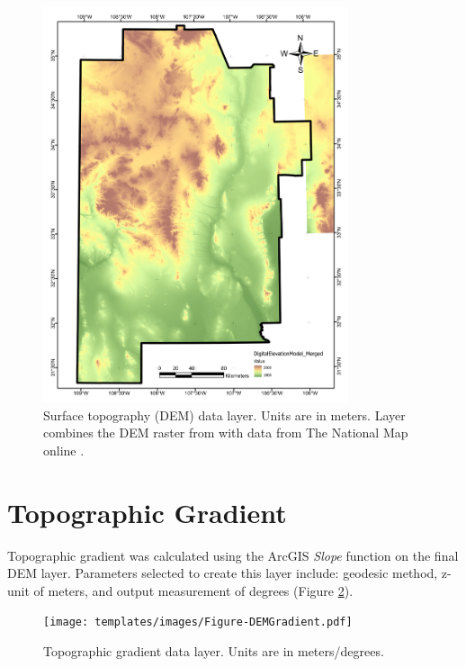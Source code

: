 \begin{figure}[H]
\centering
\includegraphics[width=0.8\textwidth]{templates/images/Figure-DEM.pdf}
\caption[Surface topography (DEM) data layer]{Surface topography (DEM) data layer. Units are in meters. Layer combines the DEM raster from \citet{bielicki_hydrogeolgic_2015} with data from The National Map online \citep{usgs_tnm_2021}.}
\label{fig:feat_dem}
\end{figure}
\pagebreak

\section{Topographic Gradient}\label{app:dl_dem_gradient}
Topographic gradient was calculated using the ArcGIS \textit{Slope} function on the final DEM layer. Parameters selected to create this layer include: geodesic method, z-unit of meters, and output measurement of degrees (Figure \ref{fig:feat_dem_gradient}).

\begin{figure}[H]
\centering
\texttt{[image: templates/images/Figure-DEMGradient.pdf]}
\caption[Topographic gradient data layer]{Topographic gradient data layer. Units are in meters/degrees.}
\label{fig:feat_dem_gradient}
\end{figure}
\pagebreak

